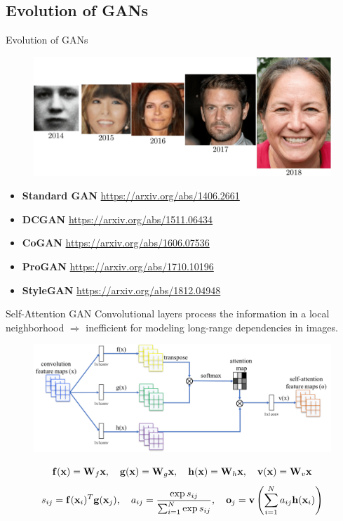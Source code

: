 \documentclass{beamer}
\begin{document}
\subsection{Evolution of GANs}
\begin{frame}{Evolution of GANs}
	\begin{figure}
		\centering
		\includegraphics[width=\linewidth]{figs/gan_evolution}
	\end{figure}
	\begin{itemize}
		\item \textbf{Standard GAN} \href{https://arxiv.org/abs/1406.2661}{https://arxiv.org/abs/1406.2661}
		\item \textbf{DCGAN} \href{https://arxiv.org/abs/1511.06434}{https://arxiv.org/abs/1511.06434}
		\item \textbf{CoGAN} \href{https://arxiv.org/abs/1606.07536}{https://arxiv.org/abs/1606.07536}
		\item \textbf{ProGAN} \href{https://arxiv.org/abs/1710.10196}{https://arxiv.org/abs/1710.10196} 
		\item \textbf{StyleGAN} \href{https://arxiv.org/abs/1812.04948}{https://arxiv.org/abs/1812.04948}
	\end{itemize}
\end{frame}
\begin{frame}{Self-Attention GAN}
	Convolutional layers process the information in a local neighborhood $\Rightarrow$ inefficient for modeling long-range dependencies in images.
	\vspace{-0.3cm}
	\begin{figure}
		\centering
		\includegraphics[width=0.9\linewidth]{figs/self-attention}
	\end{figure}
	\[
	\mathbf{f}(\mathbf{x}) = \mathbf{W}_f \mathbf{x}, \quad \mathbf{g}(\mathbf{x}) = \mathbf{W}_g\mathbf{x}, \quad \mathbf{h} (\mathbf{x}) = \mathbf{W}_h\mathbf{x}, \quad \mathbf{v}(\mathbf{x}) = \mathbf{W}_v\mathbf{x}
	\]
	\[
	s_{ij} = \mathbf{f}(\mathbf{x}_i)^T \mathbf{g}(\mathbf{x}_j), \quad a_{ij} = \frac{\exp{s_{ij}}}{\sum_{i=1}^N \exp{s_{ij}}}, \quad \textbf{o}_j = \textbf{v}\left( \sum_{i=1}^N a_{ij} \mathbf{h}(\mathbf{x}_i) \right)
	\]
\end{frame}
\end{document}

